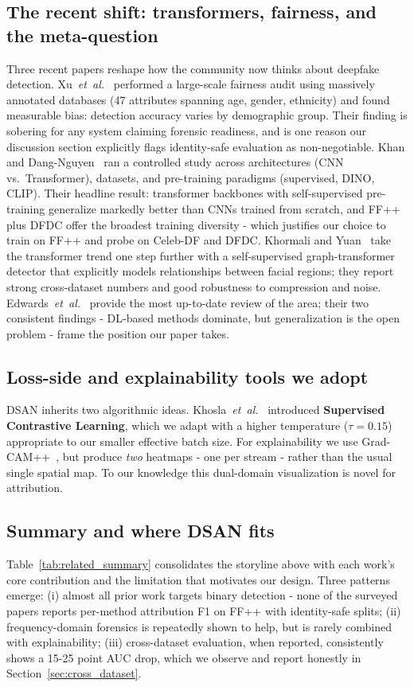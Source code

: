 \subsection{The recent shift: transformers, fairness, and the meta-question}
Three recent papers reshape how the community now thinks about deepfake detection. Xu~\textit{et~al.}~\cite{xu2024fairness} performed a large-scale fairness audit using massively annotated databases (47 attributes spanning age, gender, ethnicity) and found measurable bias: detection accuracy varies by demographic group. Their finding is sobering for any system claiming forensic readiness, and is one reason our discussion section explicitly flags identity-safe evaluation as non-negotiable. Khan and Dang-Nguyen~\cite{khan2024generalization} ran a controlled study across architectures (CNN vs.\ Transformer), datasets, and pre-training paradigms (supervised, DINO, CLIP). Their headline result: transformer backbones with self-supervised pre-training generalize markedly better than CNNs trained from scratch, and FF++ plus DFDC offer the broadest training diversity - which justifies our choice to train on FF++ and probe on Celeb-DF and DFDC. Khormali and Yuan~\cite{khormali2024selfsupgraph} take the transformer trend one step further with a self-supervised graph-transformer detector that explicitly models relationships between facial regions; they report strong cross-dataset numbers and good robustness to compression and noise. Edwards~\textit{et~al.}~\cite{edwards2024review} provide the most up-to-date review of the area; their two consistent findings - DL-based methods dominate, but generalization is the open problem - frame the position our paper takes.

\subsection{Loss-side and explainability tools we adopt}
DSAN inherits two algorithmic ideas. Khosla~\textit{et~al.}~\cite{khosla2020supervised} introduced \textbf{Supervised Contrastive Learning}, which we adapt with a higher temperature ($\tau{=}0.15$) appropriate to our smaller effective batch size. For explainability we use Grad-CAM++~\cite{chattopadhay2018gradcampp}, but produce \textit{two} heatmaps - one per stream - rather than the usual single spatial map. To our knowledge this dual-domain visualization is novel for attribution.

\subsection{Summary and where DSAN fits}
Table~\ref{tab:related_summary} consolidates the storyline above with each work's core contribution and the limitation that motivates our design. Three patterns emerge:
(i) almost all prior work targets binary detection - none of the surveyed papers reports per-method attribution F1 on FF++ with identity-safe splits;
(ii) frequency-domain forensics is repeatedly shown to help, but is rarely combined with explainability;
(iii) cross-dataset evaluation, when reported, consistently shows a 15-25 point AUC drop, which we observe and report honestly in Section~\ref{sec:cross_dataset}.

